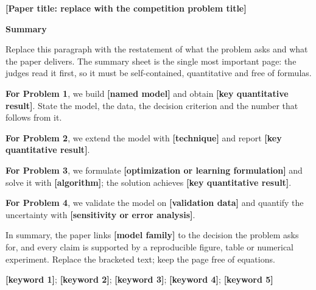 \documentclass[12pt,letterpaper]{article}
\newcommand{\titlefont}{\fontsize{16pt}{20pt}\selectfont\bfseries}
\newcommand{\sectiontitlefont}{\fontsize{13.5pt}{17pt}\selectfont\bfseries}
\newcommand{\bodyfont}{\fontsize{12pt}{16pt}\selectfont}
\newcommand{\keywordfont}{\fontsize{12pt}{16pt}\selectfont\bfseries}
\newcommand{\paperstrong}[1]{\textbf{#1}}
\begin{document}
\label{body:start}

\begin{center}
\vspace*{0.6cm}
{\titlefont [Paper title: replace with the competition problem title]\par}
\vspace{0.35cm}
\end{center}

\begin{center}
{\sectiontitlefont Summary}
\end{center}

\vspace{0.25cm}
\bodyfont

\indent Replace this paragraph with the restatement of what the problem asks and what the paper delivers. The summary sheet is the single most important page: the judges read it first, so it must be self-contained, quantitative and free of formulas.

\indent \paperstrong{For Problem 1}, we build \paperstrong{[named model]} and obtain \paperstrong{[key quantitative result]}. State the model, the data, the decision criterion and the number that follows from it.

\indent \paperstrong{For Problem 2}, we extend the model with \paperstrong{[technique]} and report \paperstrong{[key quantitative result]}.

\indent \paperstrong{For Problem 3}, we formulate \paperstrong{[optimization or learning formulation]} and solve it with \paperstrong{[algorithm]}; the solution achieves \paperstrong{[key quantitative result]}.

\indent \paperstrong{For Problem 4}, we validate the model on \paperstrong{[validation data]} and quantify the uncertainty with \paperstrong{[sensitivity or error analysis]}.

\indent In summary, the paper links \paperstrong{[model family]} to the decision the problem asks for, and every claim is supported by a reproducible figure, table or numerical experiment. Replace the bracketed text; keep the page free of equations.

\indent {\keywordfont \paperstrong{Keywords:}} \paperstrong{[keyword 1]}; \paperstrong{[keyword 2]}; \paperstrong{[keyword 3]}; \paperstrong{[keyword 4]}; \paperstrong{[keyword 5]}\label{abstract:end}

\newpage

\tableofcontents
\newpage
\end{document}
